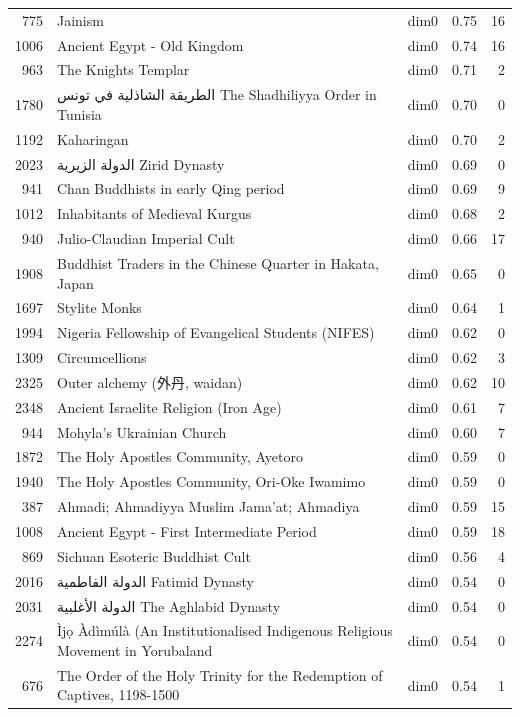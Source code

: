 \begin{tabular}{rllrr}
775 & Jainism & dim0 & 0.75 & 16 \\
1006 & Ancient Egypt - Old Kingdom & dim0 & 0.74 & 16 \\
963 & The Knights Templar & dim0 & 0.71 & 2 \\
1780 & الطريقة الشاذلية في تونس The Shadhiliyya Order in Tunisia & dim0 & 0.70 & 0 \\
1192 & Kaharingan & dim0 & 0.70 & 2 \\
2023 & الدولة الزيرية Zirid Dynasty & dim0 & 0.69 & 0 \\
941 & Chan Buddhists in early Qing period & dim0 & 0.69 & 9 \\
1012 & Inhabitants of Medieval Kurgus & dim0 & 0.68 & 2 \\
940 & Julio-Claudian Imperial Cult & dim0 & 0.66 & 17 \\
1908 & Buddhist Traders in the Chinese Quarter in Hakata, Japan & dim0 & 0.65 & 0 \\
1697 & Stylite Monks & dim0 & 0.64 & 1 \\
1994 & Nigeria Fellowship of Evangelical Students (NIFES) & dim0 & 0.62 & 0 \\
1309 & Circumcellions & dim0 & 0.62 & 3 \\
2325 & Outer alchemy (外丹, waidan) & dim0 & 0.62 & 10 \\
2348 & Ancient Israelite Religion (Iron Age) & dim0 & 0.61 & 7 \\
944 & Mohyla's Ukrainian Church & dim0 & 0.60 & 7 \\
1872 & The Holy Apostles Community, Ayetoro & dim0 & 0.59 & 0 \\
1940 & The Holy Apostles Community, Ori-Oke Iwamimo & dim0 & 0.59 & 0 \\
387 & Ahmadi; Ahmadiyya Muslim Jama'at; Ahmadiya & dim0 & 0.59 & 15 \\
1008 & Ancient Egypt - First Intermediate Period & dim0 & 0.59 & 18 \\
869 & Sichuan Esoteric Buddhist Cult & dim0 & 0.56 & 4 \\
2016 & الدولة الفاطمية Fatimid Dynasty & dim0 & 0.54 & 0 \\
2031 & الدولة الأغلبية The Aghlabid Dynasty & dim0 & 0.54 & 0 \\
2274 & Ìjọ Àdìmúlà (An Institutionalised Indigenous Religious Movement in Yorubaland & dim0 & 0.54 & 0 \\
676 & The Order of the Holy Trinity for the Redemption of Captives, 1198-1500 & dim0 & 0.54 & 1 \\

\end{tabular}
